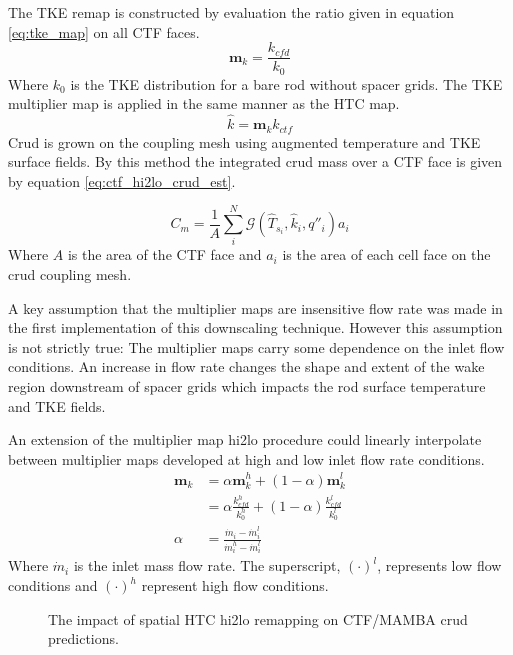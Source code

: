     The TKE remap is constructed by evaluation the ratio given in equation \ref{eq:tke_map} on all CTF faces.
    \begin{equation}
       \mathbf m_{k} = \frac{k_{cfd}}{k_{0}}
       \label{eq:tke_map}
    \end{equation}
    Where $k_0$ is the TKE distribution for a bare rod without spacer grids.
    The TKE multiplier map is applied in the same manner as the HTC map.
       \begin{equation}
       \hat k = \mathbf m_k k_{ctf}
       \end{equation}
Crud is grown on the coupling mesh using augmented temperature and TKE surface fields. By this method the integrated crud mass over a CTF face is given by equation \ref{eq:ctf_hi2lo_crud_est}.

 \begin{equation}
     C_m = \frac{1}{A} \sum_i^N \mathcal G(\hat T_{s_i}, \hat k_i, q''_i) a_i
 \label{eq:ctf_hi2lo_crud_est}
 \end{equation}
Where $A$ is the area of the CTF face and $a_i$ is the area of each cell face on the crud coupling mesh.

A key assumption that the multiplier maps are insensitive flow rate was made in the first implementation of this downscaling technique.  However this assumption is not strictly true: The multiplier maps carry some dependence on the inlet flow conditions.  An increase in flow rate changes the shape and extent of the wake region downstream of spacer grids which impacts the rod surface temperature and TKE fields.

    An extension of the multiplier map hi2lo procedure could linearly interpolate between multiplier maps developed at high and low inlet flow rate conditions.
    \begin{align*}
        \mathbf m_k &= \alpha \mathbf m_k^h + (1 - \alpha) \mathbf m_k^l \\
                    &= \alpha \frac{k^h_{cfd}}{k^h_0} + (1 - \alpha) \frac{k^l_{cfd}}{k^l_0} \\
        \alpha & = \frac{\dot m_i - \dot m_i^l }{\dot m_i^h - \dot m_i^l}
    \end{align*}
    Where $\dot m_i$ is the inlet mass flow rate.  The superscript, $(\cdot)^l$, represents low flow conditions and $(\cdot)^h$ represent high flow conditions.


\begin{figure}[H]%
    \centering
    \qquad
    \caption[The impact of spatial HTC hi2lo remapping on CTF/MAMBA crud predictions.]{The impact of spatial HTC hi2lo remapping on CTF/MAMBA crud predictions.}%
    \label{fig:htc_remap_crud}%
\end{figure}


